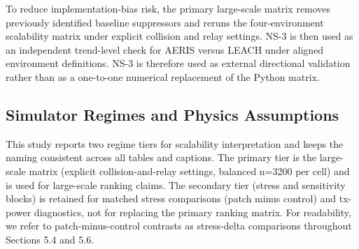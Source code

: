 ﻿\documentclass[sensors,article,submit,moreauthors,pdftex]{Definitions/mdpi}
\begin{document}
To reduce implementation-bias risk, the primary large-scale matrix removes previously identified baseline suppressors and reruns the four-environment scalability matrix under explicit collision and relay settings. NS-3 is then used as an independent trend-level check for AERIS versus LEACH under aligned environment definitions. NS-3 is therefore used as external directional validation rather than as a one-to-one numerical replacement of the Python matrix.

\subsection{Simulator Regimes and Physics Assumptions}
This study reports two regime tiers for scalability interpretation and keeps the naming consistent across all tables and captions. The primary tier is the large-scale matrix (explicit collision-and-relay settings, balanced n=3200 per cell) and is used for large-scale ranking claims. The secondary tier (stress and sensitivity blocks) is retained for matched stress comparisons (patch minus control) and tx-power diagnostics, not for replacing the primary ranking matrix. For readability, we refer to patch-minus-control contrasts as stress-delta comparisons throughout Sections 5.4 and 5.6.

\begin{table}[H]
\caption{Evidence-regime map used in this manuscript.}
\label{tab:regime_map}
\centering
{}
\end{table}
\end{document}
